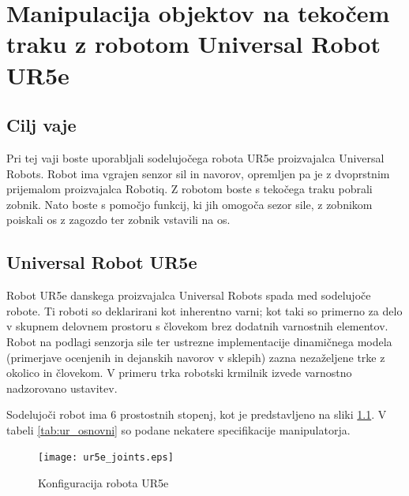 \graphicspath{{../}{./}{./slike_UR/}}
\chapter{{Manipulacija objektov na tekočem traku z robotom Universal Robot UR5e}}\label{Pog:UR}


\section{Cilj vaje}
Pri tej vaji boste uporabljali sodelujočega robota UR5e proizvajalca Universal Robots. Robot ima vgrajen senzor sil in navorov, opremljen pa je z dvoprstnim prijemalom proizvajalca Robotiq. Z robotom boste s tekočega traku pobrali zobnik. Nato boste s pomočjo funkcij, ki jih omogoča sezor sile, z zobnikom poiskali os z zagozdo ter zobnik vstavili na os.


\section{Universal Robot UR5e}

Robot UR5e danskega proizvajalca Universal Robots spada med sodelujoče robote. Ti roboti so deklarirani kot inherentno varni; kot taki so primerno za delo v skupnem delovnem prostoru s človekom brez dodatnih varnostnih elementov. Robot na podlagi senzorja sile ter ustrezne implementacije dinamičnega modela (primerjave ocenjenih in dejanskih navorov v sklepih) zazna nezaželjene trke z okolico in človekom. V primeru trka robotski krmilnik izvede varnostno nadzorovano ustavitev.

Sodelujoči robot ima 6 prostostnih stopenj, kot je predstavljeno na sliki \ref{fig:ur_conf}. V tabeli \ref{tab:ur_osnovni} so podane nekatere specifikacije manipulatorja.


\begin{figure}[!hbt]
\centering
\texttt{[image: ur5e\_joints.eps]}
\caption{Konfiguracija robota UR5e}
\label{fig:ur_conf}
\end{figure}

